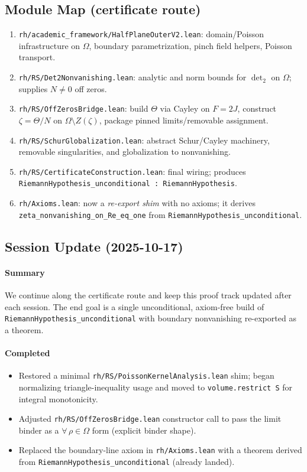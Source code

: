 \subsection{Module Map (certificate route)}
\begin{enumerate}
  \item \texttt{rh/academic\_framework/HalfPlaneOuterV2.lean}: domain/Poisson infrastructure on $\Omega$, boundary parametrization, pinch field helpers, Poisson transport.
  \item \texttt{rh/RS/Det2Nonvanishing.lean}: analytic and norm bounds for $\operatorname{det}_2$ on $\Omega$; supplies $N\neq0$ off zeros.
  \item \texttt{rh/RS/OffZerosBridge.lean}: build $\Theta$ via Cayley on $F=2J$, construct $\zeta=\Theta/N$ on $\Omega\setminus Z(\zeta)$, package pinned limits/removable assignment.
  \item \texttt{rh/RS/SchurGlobalization.lean}: abstract Schur/Cayley machinery, removable singularities, and globalization to nonvanishing.
  \item \texttt{rh/RS/CertificateConstruction.lean}: final wiring; produces \texttt{RiemannHypothesis\_unconditional : RiemannHypothesis}.
  \item \texttt{rh/Axioms.lean}: now a \emph{re\--export shim} with no axioms; it derives \texttt{zeta\_nonvanishing\_on\_Re\_eq\_one} from \texttt{RiemannHypothesis\_unconditional}.
\end{enumerate}

\subsection{Session Update (2025-10-17)}
\paragraph{Summary} We continue along the certificate route and keep this proof track updated after each session. The end goal is a single unconditional, axiom-free build of \texttt{RiemannHypothesis\_unconditional} with boundary nonvanishing re-exported as a theorem.

\paragraph{Completed}
\begin{itemize}
  \item Restored a minimal \texttt{rh/RS/PoissonKernelAnalysis.lean} shim; began normalizing triangle-inequality usage and moved to \texttt{volume.restrict S} for integral monotonicity.
  \item Adjusted \texttt{rh/RS/OffZerosBridge.lean} constructor call to pass the limit binder as a $\forall\,\rho\in\Omega$ form (explicit binder shape).
  \item Replaced the boundary-line axiom in \texttt{rh/Axioms.lean} with a theorem derived from \texttt{RiemannHypothesis\_unconditional} (already landed).
\end{itemize}

